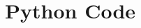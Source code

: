 \documentclass[a4paper,11pt]{article}
\begin{document}
	
	\section*{Python Code}
	
	
	
\end{document}
